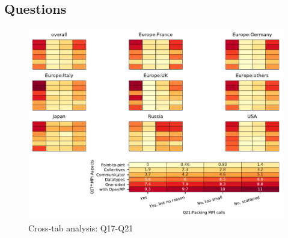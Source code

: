
\subsection{Questions}


\begin{figure}
\begin{center}
\includegraphics[width=12cm]{../pdfs/Q17-Q21.pdf}
\caption{Cross-tab analysis: Q17-Q21}
\label{fig:Q17-Q21}
\end{center}
\end{figure}
